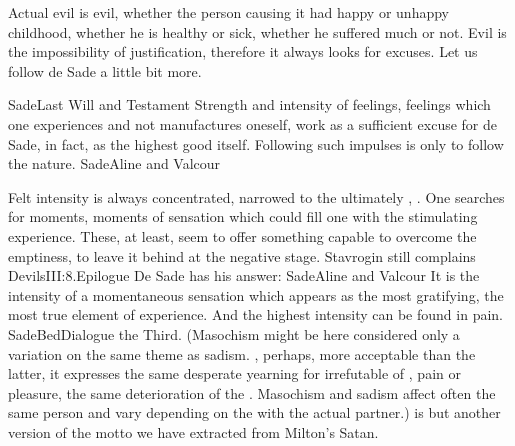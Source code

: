 Actual evil is evil, whether the person causing it had happy or unhappy
childhood, whether he is healthy or sick, whether he suffered much or not. Evil
is the impossibility of justification, therefore it always looks
for excuses. Let us follow de Sade a little bit more. 

\pa \citet{Certain souls seem hard because they are capable of strong feelings,
  and they sometimes go to rather extreme lengths; their apparent unconcern and
  cruelty are but ways, known only to themselves, of feeling more strongly than
  others.}{Sade}{Last Will and Testament} Strength and intensity of feelings,
  feelings which one 
experiences and not manufactures oneself, work as a sufficient excuse for de
Sade, in fact, as the highest good itself.  Following such impulses is only to
follow the nature.  \citet{We are no guiltier in following the primitive
  impulses that govern us than is the Nile for her floods or the sea for her
  waves.}{Sade}{Aline and Valcour}

Felt intensity is always concentrated, narrowed to the ultimately ,
. One searches for moments, moments of sensation which could fill
one with the stimulating experience. These, at least, seem to offer something
capable to overcome the emptiness, to leave it behind at the negative stage.
Stavrogin still complains \citet{Here I liked to live least. But even here I was
  unable to hate anything. [...] I may desire to make a good act and it causes
  me pleasure. But just in a moment I desire an evil one and feel equal
  pleasure. Both this and that feeling is as always too flat, and I never desire
  strongly.}{Devils}{III:8.Epilogue} De Sade has his answer: \citet{True
  felicity lies only in the senses, and virtue gratifies none of
  them.}{Sade}{Aline and Valcour} It is the intensity of a momentaneous
sensation which appears 
as the most gratifying, the most true element of experience.
And the highest intensity can be found in pain.  \citet{[W]e are much more
  keenly affected by pain than by pleasure: reverberations which result in us
  when the sensation of pain is produced in others will essentially be of a more
  vigorous character, more incisive, will more energetically resound in us [...]
  hence pain must be prefered, for pain's telling effects cannot deceive, and
  its vibrations are more powerful.}{SadeBed}{Dialogue the Third. 
  (Masochism might be
  here considered only a variation on the same theme as sadism.
, perhaps, more acceptable than the latter, it expresses the same
  desperate yearning for irrefutable  of , pain or
  pleasure, the same deterioration of the . Masochism and sadism affect
  often the same person and vary depending on the  with
  the actual partner.) }   is but another version of the motto we have extracted from Milton's
Satan.

